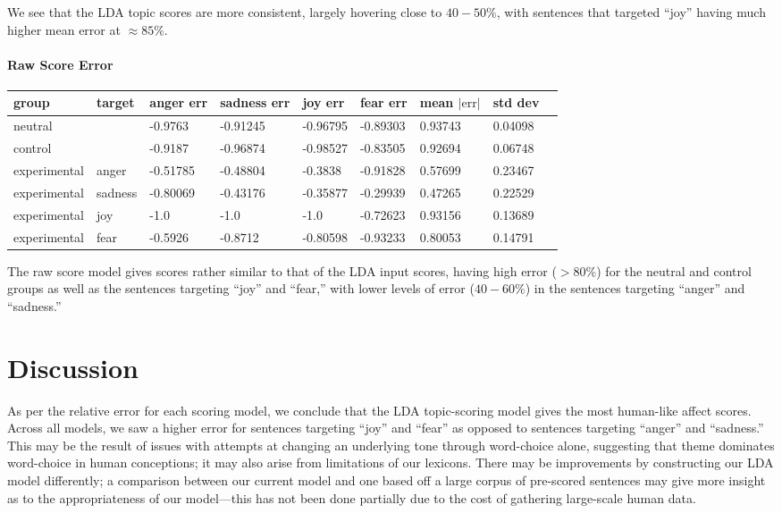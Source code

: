 \documentclass[11pt, twoside, reqno]{book}
\begin{document}
We see that the LDA topic scores are more consistent, largely hovering close to $40-50\%$, with sentences that targeted ``joy'' having much higher mean error at $\approx85\%$.

\subsubsection{\textbf{Raw Score Error}}

\begin{tabular}{|l|l|l|l|l|l|l|l|l|}
\hline
    group & target & anger err & sadness err & joy err & fear err & mean $|\text{err}|$ & std dev  \\ \hline
    neutral &  & -0.9763 & -0.91245 & -0.96795 & -0.89303 & 0.93743 & 0.04098  \\ \hline
    control &  & -0.9187 & -0.96874 & -0.98527 & -0.83505 & 0.92694 & 0.06748  \\ \hline
    experimental & anger & -0.51785 & -0.48804 & -0.3838 & -0.91828 & 0.57699 & 0.23467  \\ \hline
    experimental & sadness & -0.80069 & -0.43176 & -0.35877 & -0.29939 & 0.47265 & 0.22529  \\ \hline
    experimental & joy & -1.0 & -1.0 & -1.0 & -0.72623 & 0.93156 & 0.13689  \\ \hline
    experimental & fear & -0.5926 & -0.8712 & -0.80598 & -0.93233 & 0.80053 & 0.14791  \\ \hline
\end{tabular}
\vspace{16pt}

The raw score model gives scores rather similar to that of the LDA input scores, having high error ($>80\%$) for the neutral and control groups as well as the sentences targeting ``joy'' and ``fear,'' with lower levels of error ($40-60\%$) in the sentences targeting ``anger'' and ``sadness.''







\chapter{Discussion}

As per the relative error for each scoring model, we conclude that the LDA topic-scoring model gives the most human-like affect scores. Across all models, we saw a higher error for sentences targeting ``joy'' and ``fear'' as opposed to sentences targeting ``anger'' and ``sadness.'' This may be the result of issues with attempts at changing an underlying tone through word-choice alone, suggesting that theme dominates word-choice in human conceptions; it may also arise from limitations of our lexicons. There may be improvements by constructing our LDA model differently; a comparison between our current model and one based off a large corpus of pre-scored sentences may give more insight as to the appropriateness of our model—this has not been done partially due to the cost of gathering large-scale human data.
\end{document}

